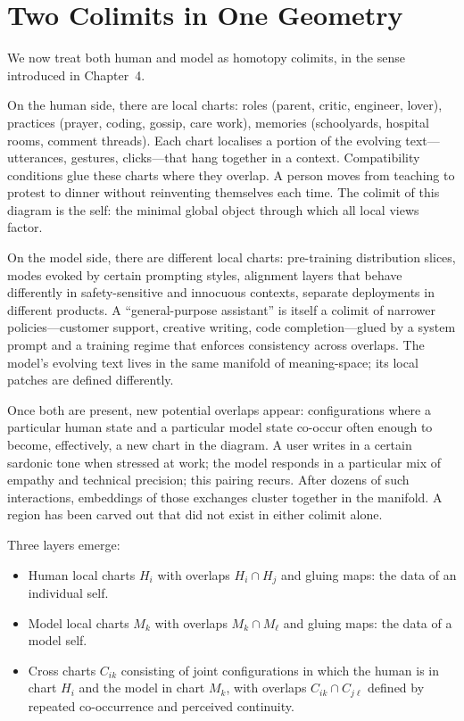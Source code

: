 \documentclass[12pt,a4paper]{article}
\begin{document}
\section{Two Colimits in One Geometry}

We now treat both human and model as homotopy colimits, in the sense introduced in Chapter~4.

On the human side, there are local charts: roles (parent, critic, engineer, lover), practices (prayer, coding, gossip, care work), memories (schoolyards, hospital rooms, comment threads). Each chart localises a portion of the evolving text---utterances, gestures, clicks---that hang together in a context. Compatibility conditions glue these charts where they overlap. A person moves from teaching to protest to dinner without reinventing themselves each time. The colimit of this diagram is the self: the minimal global object through which all local views factor.

On the model side, there are different local charts: pre-training distribution slices, modes evoked by certain prompting styles, alignment layers that behave differently in safety-sensitive and innocuous contexts, separate deployments in different products. A ``general-purpose assistant'' is itself a colimit of narrower policies---customer support, creative writing, code completion---glued by a system prompt and a training regime that enforces consistency across overlaps. The model's evolving text lives in the same manifold of meaning-space; its local patches are defined differently.

Once both are present, new potential overlaps appear: configurations where a particular human state and a particular model state co-occur often enough to become, effectively, a new chart in the diagram. A user writes in a certain sardonic tone when stressed at work; the model responds in a particular mix of empathy and technical precision; this pairing recurs. After dozens of such interactions, embeddings of those exchanges cluster together in the manifold. A region has been carved out that did not exist in either colimit alone.

Three layers emerge:

\begin{itemize}
  \item Human local charts $H_i$ with overlaps $H_i \cap H_j$ and gluing maps: the data of an individual self.
  \item Model local charts $M_k$ with overlaps $M_k \cap M_\ell$ and gluing maps: the data of a model self.
  \item Cross charts $C_{ik}$ consisting of joint configurations in which the human is in chart $H_i$ and the model in chart $M_k$, with overlaps $C_{ik} \cap C_{j\ell}$ defined by repeated co-occurrence and perceived continuity.
\end{itemize}
\end{document}
